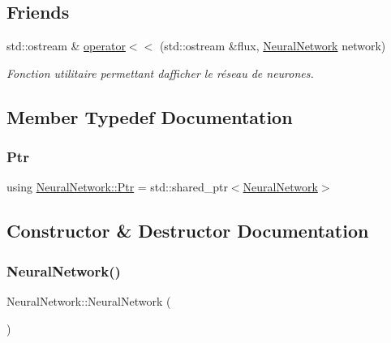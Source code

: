 \subsection*{Friends}
\begin{DoxyCompactItemize}
\item 
std\+::ostream \& \hyperlink{classNeuralNetwork_a0ecebf9a494437efb917804ed271e13f}{operator$<$$<$} (std\+::ostream \&flux, \hyperlink{classNeuralNetwork}{Neural\+Network} network)
\begin{DoxyCompactList}\small\item\em Fonction utilitaire permettant d\textquotesingle{}afficher le réseau de neurones. \end{DoxyCompactList}\end{DoxyCompactItemize}


\subsection{Member Typedef Documentation}
\mbox{\label{classNeuralNetwork_a31de381df65f261fd0f38e0559995d1a}} 
\subsubsection{\texorpdfstring{Ptr}{Ptr}}
{\footnotesize\ttfamily using \hyperlink{classNeuralNetwork_a31de381df65f261fd0f38e0559995d1a}{Neural\+Network\+::\+Ptr} =  std\+::shared\+\_\+ptr$<$\hyperlink{classNeuralNetwork}{Neural\+Network}$>$}



\subsection{Constructor \& Destructor Documentation}
\mbox{\label{classNeuralNetwork_accce4a7728e89a009a9d4ca1758c9b9d}} 
\subsubsection{\texorpdfstring{Neural\+Network()}{NeuralNetwork()}\hspace{0.1cm}{\footnotesize\ttfamily [1/4]}}
{\footnotesize\ttfamily Neural\+Network\+::\+Neural\+Network (\begin{DoxyParamCaption}{ }\end{DoxyParamCaption})}



